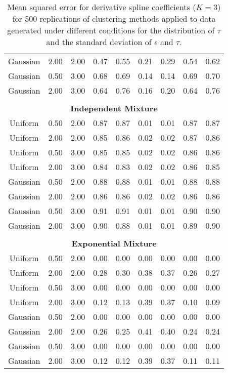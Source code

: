 \begin{table}[ht]
\begin{center}
\begin{tabular}{ccc|cccccc}
  Gaussian & 2.00 & 2.00 & 0.47 & 0.55 & 0.21 & 0.29 & 0.54 & 0.62 \\ 
  Gaussian & 0.50 & 3.00 & 0.68 & 0.69 & 0.14 & 0.14 & 0.69 & 0.70 \\ 
  Gaussian & 2.00 & 3.00 & 0.64 & 0.76 & 0.16 & 0.20 & 0.64 & 0.76 \\ 
   \\ \multicolumn{9}{c}{\textbf{Independent Mixture}}\\Uniform & 0.50 & 2.00 & 0.87 & 0.87 & 0.01 & 0.01 & 0.87 & 0.87 \\ 
  Uniform & 2.00 & 2.00 & 0.85 & 0.86 & 0.02 & 0.02 & 0.87 & 0.86 \\ 
  Uniform & 0.50 & 3.00 & 0.85 & 0.85 & 0.02 & 0.02 & 0.86 & 0.86 \\ 
  Uniform & 2.00 & 3.00 & 0.84 & 0.83 & 0.02 & 0.02 & 0.86 & 0.85 \\ 
  Gaussian & 0.50 & 2.00 & 0.88 & 0.88 & 0.01 & 0.01 & 0.88 & 0.88 \\ 
  Gaussian & 2.00 & 2.00 & 0.86 & 0.86 & 0.02 & 0.02 & 0.86 & 0.86 \\ 
  Gaussian & 0.50 & 3.00 & 0.91 & 0.91 & 0.01 & 0.01 & 0.90 & 0.90 \\ 
  Gaussian & 2.00 & 3.00 & 0.90 & 0.88 & 0.01 & 0.01 & 0.89 & 0.90 \\ 
   \\ \multicolumn{9}{c}{\textbf{Exponential Mixture}}\\Uniform & 0.50 & 2.00 & 0.00 & 0.00 & 0.00 & 0.00 & 0.00 & 0.00 \\ 
  Uniform & 2.00 & 2.00 & 0.28 & 0.30 & 0.38 & 0.37 & 0.26 & 0.27 \\ 
  Uniform & 0.50 & 3.00 & 0.00 & 0.00 & 0.00 & 0.00 & 0.00 & 0.00 \\ 
  Uniform & 2.00 & 3.00 & 0.12 & 0.13 & 0.39 & 0.37 & 0.10 & 0.09 \\ 
  Gaussian & 0.50 & 2.00 & 0.00 & 0.00 & 0.00 & 0.00 & 0.00 & 0.00 \\ 
  Gaussian & 2.00 & 2.00 & 0.26 & 0.25 & 0.41 & 0.40 & 0.24 & 0.24 \\ 
  Gaussian & 0.50 & 3.00 & 0.00 & 0.00 & 0.00 & 0.00 & 0.00 & 0.00 \\ 
  Gaussian & 2.00 & 3.00 & 0.12 & 0.12 & 0.39 & 0.37 & 0.11 & 0.11 \\ 
   \hline\end{tabular}
\caption{Mean squared error for derivative spline coefficients ($K=3$) for 500 replications of clustering methods applied to data generated under different conditions for the distribution of $\tau$ and the standard deviation of $\epsilon$ and $\tau$.}
\label{tab:mse1}
\end{center}
\end{table}
